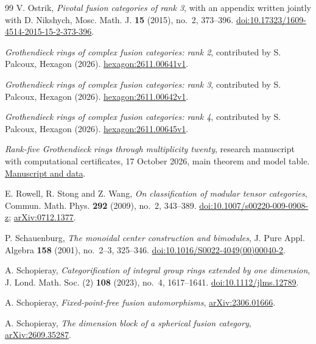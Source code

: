 \documentclass[11pt,a4paper]{article}
\numberwithin{equation}{section}
\begin{document}
\begin{thebibliography}{99}
V. Ostrik, \emph{Pivotal fusion categories of rank 3}, with an appendix
written jointly with D. Nikshych, Mosc. Math. J. \textbf{15} (2015),
no.~2, 373--396.
\href{https://doi.org/10.17323/1609-4514-2015-15-2-373-396}{doi:10.17323/1609-4514-2015-15-2-373-396}.

 \emph{Grothendieck rings of complex fusion categories: rank 2}, contributed by S. Palcoux, Hexagon (2026). \href{https://hexagonmath.org/2611.00641v1}{hexagon:2611.00641v1}.

 \emph{Grothendieck rings of complex fusion categories: rank 3}, contributed by S. Palcoux, Hexagon (2026). \href{https://hexagonmath.org/2611.00642v1}{hexagon:2611.00642v1}.

 \emph{Grothendieck rings of complex fusion categories: rank 4}, contributed by S. Palcoux, Hexagon (2026). \href{https://hexagonmath.org/2611.00645v1}{hexagon:2611.00645v1}.

 \emph{Rank-five Grothendieck rings through multiplicity twenty}, research manuscript with computational certificates, 17 October 2026, main theorem and model table. \href{https://github.com/sebastienpalcoux/grothendieck-ring-classification/tree/d35cb684d2f27cca18f89ab24c769af756c16160/manuscripts/rank5}{Manuscript and data}.

 E. Rowell, R. Stong and Z. Wang,
\emph{On classification of modular tensor categories},
Commun. Math. Phys. \textbf{292} (2009), no.~2, 343--389.
\href{https://doi.org/10.1007/s00220-009-0908-z}{doi:10.1007/s00220-009-0908-z};
\href{https://arxiv.org/abs/0712.1377}{arXiv:0712.1377}.

 P. Schauenburg,
\emph{The monoidal center construction and bimodules},
J. Pure Appl. Algebra \textbf{158} (2001), no.~2--3, 325--346.
\href{https://doi.org/10.1016/S0022-4049(00)00040-2}{doi:10.1016/S0022-4049(00)00040-2}.

 A. Schopieray, \emph{Categorification of integral group rings extended by one dimension}, J. Lond. Math. Soc. (2) \textbf{108} (2023), no.~4, 1617--1641. \href{https://doi.org/10.1112/jlms.12789}{doi:10.1112/jlms.12789}.

 A. Schopieray, \emph{Fixed-point-free fusion automorphisms}, \href{https://arxiv.org/abs/2306.01666}{arXiv:2306.01666}.

 A. Schopieray, \emph{The dimension block of a spherical fusion category}, \href{https://arxiv.org/abs/2609.35287}{arXiv:2609.35287}.


\end{thebibliography}
\end{document}
